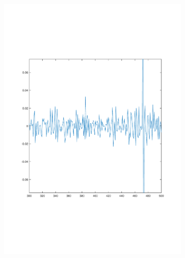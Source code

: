 \documentclass[sigconf]{acmart}
\begin{document}
\begin{figure}[!htp]
\begin{subfigure}[t]{0.4\linewidth}
		\includegraphics[width=0.95\linewidth, trim={100 100 0 0}, clip]{fig/RTT_20}
		\label{fig:3.3b}
	\end{subfigure}
	\begin{subfigure}[t]{0.4\linewidth}
		\centering

\end{subfigure}
\end{figure}
\end{document}
